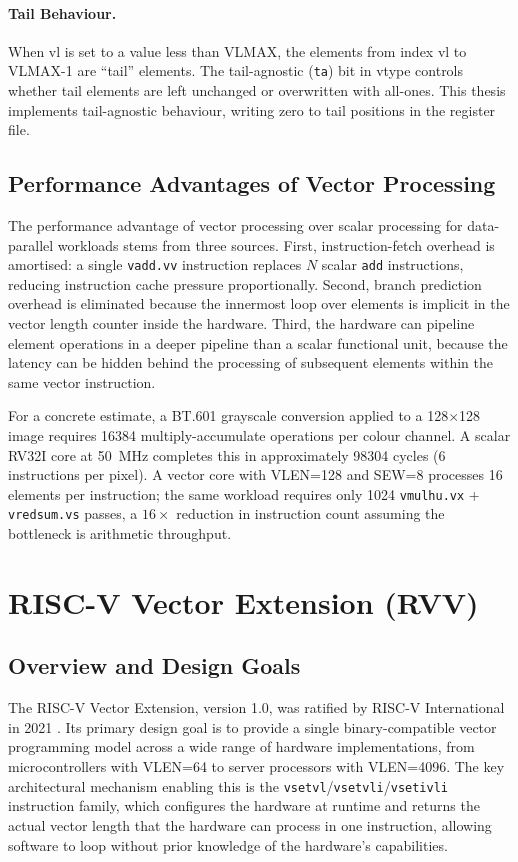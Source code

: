\paragraph{Tail Behaviour.}
When vl is set to a value less than VLMAX, the elements from index vl to VLMAX-1
are ``tail'' elements. The tail-agnostic (\texttt{ta}) bit in vtype controls whether
tail elements are left unchanged or overwritten with all-ones. This thesis implements
tail-agnostic behaviour, writing zero to tail positions in the register file.

\subsection{Performance Advantages of Vector Processing}

The performance advantage of vector processing over scalar processing for data-parallel
workloads stems from three sources. First, instruction-fetch overhead is amortised:
a single \texttt{vadd.vv} instruction replaces $N$ scalar \texttt{add} instructions,
reducing instruction cache pressure proportionally. Second, branch prediction overhead
is eliminated because the innermost loop over elements is implicit in the vector length
counter inside the hardware. Third, the hardware can pipeline element operations in
a deeper pipeline than a scalar functional unit, because the latency can be hidden
behind the processing of subsequent elements within the same vector instruction.

For a concrete estimate, a BT.601 grayscale conversion applied to a 128$\times$128
image requires 16384 multiply-accumulate operations per colour channel. A scalar RV32I
core at 50~MHz completes this in approximately 98304 cycles (6 instructions per pixel).
A vector core with VLEN=128 and SEW=8 processes 16 elements per instruction; the same
workload requires only 1024 \texttt{vmulhu.vx} + \texttt{vredsum.vs} passes, a
$16\times$ reduction in instruction count assuming the bottleneck is arithmetic
throughput.

\section{RISC-V Vector Extension (RVV)}
\label{sec:rvv}

\subsection{Overview and Design Goals}

The RISC-V Vector Extension, version 1.0, was ratified by RISC-V International in
2021 \cite{rvv-spec-1-0}. Its primary design goal is to provide a single binary-compatible
vector programming model across a wide range of hardware implementations, from
microcontrollers with VLEN=64 to server processors with VLEN=4096. The key architectural
mechanism enabling this is the \texttt{vsetvl}/\texttt{vsetvli}/\texttt{vsetivli}
instruction family, which configures the hardware at runtime and returns the actual
vector length that the hardware can process in one instruction, allowing software to
loop without prior knowledge of the hardware's capabilities.

